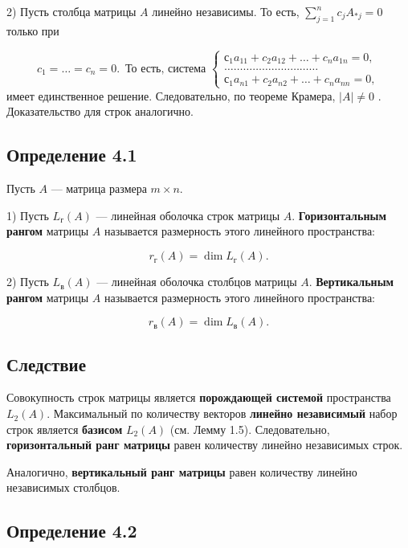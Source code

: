 {2) Пусть столбца матрицы \(A\) линейно независимы. То есть, \(\sum_{j=1}^n{c_j A_{*j} = 0}\) только при

\[
c_1 = \dots = c_n = 0.\,\,\, \text{То есть, система }
\begin{cases}
с_{1}a_{11} + c_2a_{12} + \dots + c_n a_{1n} = 0, \\
\dots \dots \dots \dots\dots\dots\dots\dots\dots\dots \\
с_{1}a_{n1} + c_2a_{n2} + \dots + c_n a_{nn} = 0,
\end{cases}
\]
имеет единственное решение. Следовательно, по теореме Крамера,    \(|A| \neq 0\)  .
Доказательство для строк аналогично.

\subsection*{Определение 4.1}

Пусть \( A \) — матрица размера \( m \times n \).

1) Пусть \( L_\text{г}(A) \) — линейная оболочка строк матрицы \( A \). \textbf{Горизонтальным рангом} матрицы \( A \) называется размерность этого линейного пространства:



\[
r_\text{г}(A) = \dim L_\text{г}(A).
\]



2) Пусть \( L_\text{в}(A) \) — линейная оболочка столбцов матрицы \( A \). \textbf{Вертикальным рангом} матрицы \( A \) называется размерность этого линейного пространства:



\[
r_\text{в}(A) = \dim L_\text{в}(A).
\]



\subsection*{Следствие}

Совокупность строк матрицы является \textbf{порождающей системой} пространства \( L_2(A) \). Максимальный по количеству векторов \textbf{линейно независимый} набор строк является \textbf{базисом} \( L_2(A) \) (см. Лемму 1.5). Следовательно, \textbf{горизонтальный ранг матрицы} равен количеству линейно независимых строк.

Аналогично, \textbf{вертикальный ранг матрицы} равен количеству линейно независимых столбцов.

\subsection*{Определение 4.2}

}
